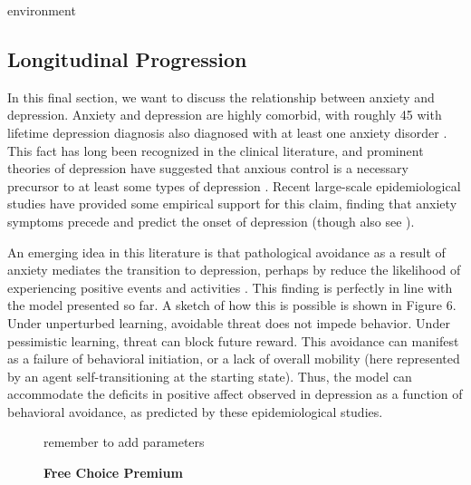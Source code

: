 environment\documentclass[11pt]{article} %
\begin{document}
\subsection{Longitudinal Progression}

In this final section, we want to discuss the relationship between anxiety and
depression. Anxiety and depression are highly comorbid, with roughly 45%
with lifetime depression diagnosis also diagnosed with at least one anxiety disorder
\citep{kessler2015}. This fact has long been recognized in the clinical literature,
and prominent theories of depression have suggested that anxious control is a necessary
precursor to at least some types of depression \citep{alloy1990}. Recent large-scale
epidemiological studies have provided  some empirical support for this claim, finding that
anxiety symptoms precede and predict the onset of depression \citep{mathew2011, jacobson2014,
kessler2015} (though also see \cite{jacobson2017, plana2019}).

An emerging idea in this literature is that pathological avoidance as a result
of anxiety mediates the transition to depression, perhaps by reduce the likelihood
of experiencing positive events and activities \citep{moitra2008, jacobson2014}.
This finding is perfectly in line with the model presented so far. A sketch of
how this is possible is shown in Figure 6. Under unperturbed learning, avoidable
threat does not impede behavior. Under pessimistic learning, threat can block
future reward. This avoidance can manifest as a failure of behavioral initiation,
or a lack of overall mobility (here represented by an agent self-transitioning
at the starting state). Thus, the model can accommodate the deficits in positive
affect observed in depression as a function of behavioral avoidance, as predicted
by these epidemiological studies.

\begin{figure}
  \centerline{%
  }
  \caption{\textbf{Free Choice Premium}}
  \par remember to add parameters
\end{figure}
\end{document}

